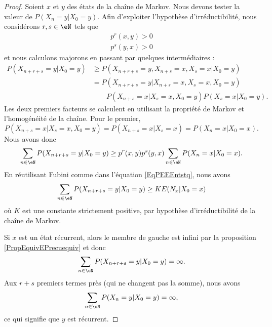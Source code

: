 \begin{proof}
    Soient \( x\) et \( y\) des états de la chaîne de Markov. Nous devons tester la valeur de \( P(X_n=y|X_0=y)\). Afin d'exploiter l'hypothèse d'irréductibilité, nous considérons \( r,s\in\eN\) tels que
    \begin{subequations}
        \begin{align}
            p^r(x,y)>0\\
            p^s(y,x)>0
        \end{align}
    \end{subequations}
    et nous calculons majorons en passant par quelques intermédiaires :
    \begin{subequations}
        \begin{align}
            P(X_{n+r+s}=y|X_0=y)&\geq P(X_{n+r+s}=y,X_{n+s}=x,X_s=x|X_0=y)\\
            &=P(X_{n+r+s}=y|X_{n+s}=x,X_s=x,X_0=y)\\
            &\qquad P(X_{n+s}=x|X_s=x,X_0=y)P(X_s=x|X_0=y)\nonumber.
        \end{align}
    \end{subequations}
    Les deux premiers facteurs se calculent en utilisant la propriété de Markov et l'homogénéité de la chaîne. Pour le premier,
    \begin{equation}
        P(X_{n+s}=x|X_s=x,X_0=y)=P(X_{n+s}=x|X_s=x)=P(X_n=x|X_0=x).
    \end{equation}
    Nous avons donc
    \begin{equation}        \label{EqRmuXtG}
        \sum_{n\in\eN}P(X_{n+r+s}=y|X_0=y)\geq p^r(x,y)p^s(y,x)\sum_{n\in\eN}P(X_n=x|X_0=x).
    \end{equation}
    En réutilisant Fubini comme dans l'équation \eqref{EqPEEEntstq}, nous avons
    \begin{equation}
        \sum_{n\in \eN}P(X_{n+r+s}=y|X_0=y)\geq KE(N_x|X_0=x)
    \end{equation}
    où \( K\) est une constante strictement positive, par hypothèse d'irréductibilité de la chaîne de Markov.

    Si \( x\) est un état récurrent, alors le membre de gauche est infini par la proposition \eqref{PropEquivEPrecuequiv} et donc
    \begin{equation}
        \sum_{n\in\eN}P(X_{n+r+s}=y|X_0=y)=\infty.
    \end{equation}
    Aux \( r+s\) premiers termes près (qui ne changent pas la somme), nous avons 
    \begin{equation}
        \sum_{n\in\eN}P(X_n=y|X_0=y)=\infty,
    \end{equation}
    ce qui signifie que \( y\) est récurrent.
\end{proof}

